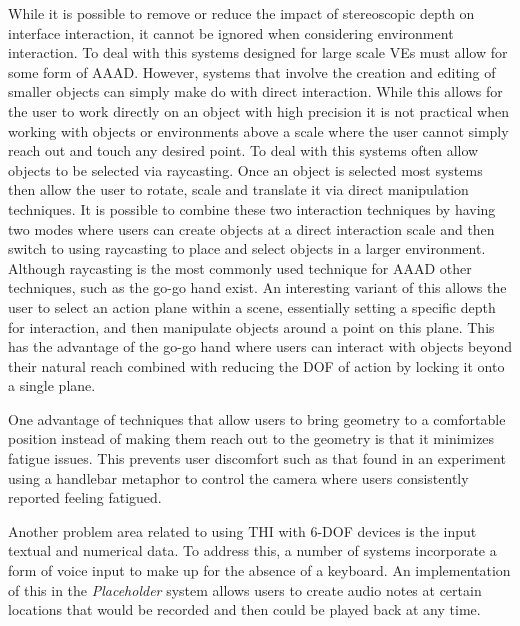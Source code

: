 \documentclass{sig-alternate-05-2015}
\begin{document}
While it is possible to remove or reduce the impact of stereoscopic depth on interface interaction, it cannot be ignored when considering environment interaction. To deal with this systems designed for large scale VEs must allow for some form of AAAD. However, systems that involve the creation and editing of smaller objects can simply make do with direct interaction\cite{Brooks2012,Jerald2013}. While this allows for the user to work directly on an object with high precision it is not practical when working with objects or environments above a scale where the user cannot simply reach out and touch any desired point. To deal with this systems often allow objects to be selected via raycasting\cite{Wang2013,Ponto2013}. Once an object is selected most systems then allow the user to rotate, scale and translate it via direct manipulation techniques\cite{Wang2013,Ponto2013,Jerald2013}. It is possible to combine these two interaction techniques by having two modes where users can create objects at a direct interaction scale and then switch to using raycasting to place and select objects in a larger environment\cite{Ponto2013}. Although raycasting is the most commonly used technique for AAAD other techniques, such as the go-go hand exist\cite{Poupyrev1996}. An interesting variant of this allows the user to select an action plane within a scene, essentially setting a specific depth for interaction, and then manipulate objects around a point on this plane\cite{Mine2014}. This has the advantage of the go-go hand where users can interact with objects beyond their natural reach combined with reducing the DOF of action by locking it onto a single plane.

One advantage of techniques that allow users to bring geometry to a comfortable position instead of making them reach out to the geometry is that it minimizes fatigue issues\cite{Jerald2013}. This prevents user discomfort such as that found in an experiment using a handlebar metaphor to control the camera where users consistently reported feeling fatigued\cite{Song2012}. 

Another problem area related to using THI with 6-DOF devices is the input textual and numerical data. To address this, a number of systems incorporate a form of voice input to make up for the absence of a keyboard\cite{Ponto2013,Toma2012}. An implementation of this in the \textit{Placeholder} system\cite{Laurel1994} allows users to create audio notes at certain locations that would be recorded and then could be played back at any time.
\end{document}
